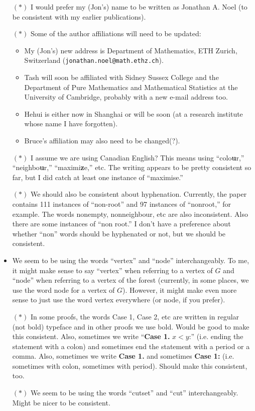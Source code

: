 \documentclass[11 pt]{article}
\begin{document}
\begin{itemize}
\item[$\boldsymbol{(*)}$] I would prefer my (Jon's) name to be written as Jonathan A. Noel (to be consistent with my earlier publications). 
\item[$\boldsymbol{(*)}$] Some of the author affiliations will need to be updated:
\begin{itemize}
\item My (Jon's) new address is Department of Mathematics, ETH Zurich, Switzerland
(\texttt{jonathan.noel@math.ethz.ch}).
\item Tash will soon be affiliated with Sidney Sussex College and the Department of Pure Mathematics and Mathematical Statistics at the University of Cambridge, probably with a new e-mail address too. 
\item Hehui is either now in Shanghai or will be soon (at a research institute whose name I have forgotten).
\item Bruce's affiliation may also need to be changed(?).
\end{itemize}
\item[$\boldsymbol{(*)}$] I assume we are using Canadian English? This means using ``colo\textbf{u}r,'' ``neighbo\textbf{u}r,'' ``maximi\textbf{z}e,'' etc. The writing appears to be pretty consistent so far, but I did catch at least one instance of ``maximise.''
\item[$\boldsymbol{(*)}$] We should also be consistent about hyphenation. Currently, the paper contains 111 instances of ``non-root'' and 97 instances of ``nonroot,'' for example. The words nonempty, nonneighbour, etc are also inconsistent. Also there are some instances of ``non root.'' I don't have a preference about whether ``non'' words should be hyphenated or not, but we should be consistent. 
\item We seem to be using the words ``vertex'' and ``node'' interchangeably. To me, it might make sense to say ``vertex'' when referring to a vertex of $G$ and ``node'' when referring to a vertex of the forest (currently, in some places, we use the word node for a vertex of $G$). However, it might make even more sense to just use the word vertex everywhere (or node, if you prefer). 
\item[$\boldsymbol{(*)}$] In some proofs, the words Case 1, Case 2, etc are written in regular (not bold) typeface and in other proofs we use bold. Would be good to make this consistent. Also, sometimes we write ``\textbf{Case 1.} $x<y$:'' (i.e. ending the statement with a colon) and sometimes end the statement with a period or a comma. Also, sometimes we write \textbf{Case 1.} and sometimes \textbf{Case 1:} (i.e. sometimes with colon, sometimes with period). Should make this consistent, too. 
\item[$\boldsymbol{(*)}$] We seem to be using the words ``cutset'' and ``cut'' interchangeably. Might be nicer to be consistent. 
\end{itemize}
\end{document}
